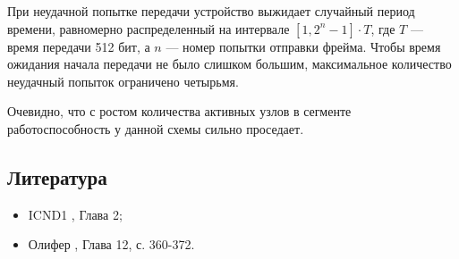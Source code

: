 При неудачной попытке передачи устройство выжидает случайный период времени, равномерно распределенный на интервале $[1, 2^n-1] \cdot T$, где $T$ --- время передачи 512 бит, а $n$ --- номер попытки отправки фрейма. Чтобы время ожидания начала передачи не было слишком большим, максимальное количество неудачный попыток ограничено четырьмя. 

Очевидно, что с ростом количества активных узлов в сегменте работоспособность у данной схемы сильно проседает.

\subsection{Литература}
\begin{itemize}
	\item ICND1 \cite{icnd1eng}, Глава 2;
	\item Олифер \cite{olipher}, Глава 12, с. 360-372.
\end{itemize}